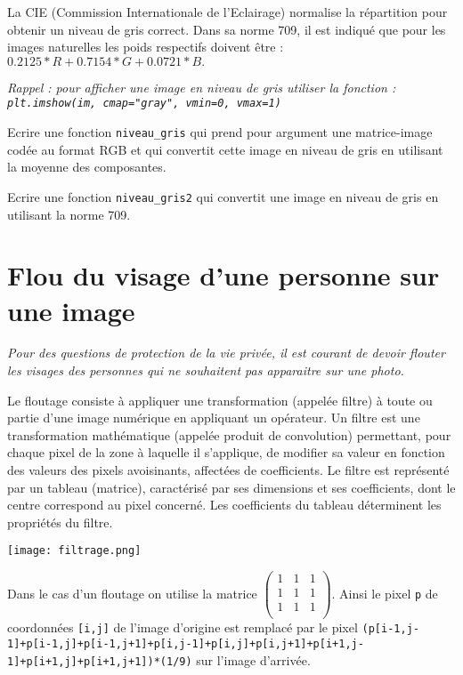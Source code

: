 La CIE (Commission Internationale de l’Eclairage) normalise la répartition pour obtenir un niveau de gris correct. Dans sa norme 709, il est indiqué que pour les images naturelles les poids respectifs doivent être : $0.2125 * R + 0.7154 * G + 0.0721 * B.$

\textit{Rappel : pour afficher une image en niveau de gris utiliser la fonction : \texttt{plt.imshow(im, cmap="gray", vmin=0, vmax=1)}}

\begin{question}
Ecrire une fonction \texttt{niveau\_gris} qui prend pour argument une matrice-image codée au format RGB et qui convertit cette image en niveau de gris en utilisant la moyenne des composantes.
\end{question}

\begin{question} %
Ecrire une fonction \texttt{niveau\_gris2} qui convertit une image en niveau de gris en utilisant la norme 709.
\end{question}





\section*{Flou du visage d'une personne sur une image}


\textit{Pour des questions de protection de la vie privée, il est courant de devoir flouter les visages des personnes qui ne souhaitent pas apparaitre sur une photo. }

Le floutage consiste à appliquer une transformation (appelée filtre) à toute ou partie d’une image numérique en  appliquant un opérateur.  Un filtre est une transformation mathématique (appelée produit de convolution) permettant, pour chaque pixel  de la zone à laquelle il s’applique, de modifier sa valeur en fonction des valeurs des pixels avoisinants, affectées de coefficients. 
 Le filtre est représenté par un tableau (matrice), caractérisé par ses dimensions et ses coefficients, dont le centre
 correspond au pixel concerné. Les coefficients du tableau déterminent les propriétés du filtre.

\begin{marginfigure}%
\texttt{[image: filtrage.png]}
\end{marginfigure}

Dans le cas d'un floutage on utilise la matrice $\begin{pmatrix}  1 &  1 & 1 \\1 &  1 & 1 \\1 &  1 & 1 \\\end{pmatrix}$. 
Ainsi le pixel \texttt{p} de coordonnées \texttt{[i,j]} de l'image d'origine est remplacé par le pixel \lstinline{(p[i-1,j-1]+p[i-1,j]+p[i-1,j+1]+p[i,j-1]+p[i,j]+p[i,j+1]+p[i+1,j-1]+p[i+1,j]+p[i+1,j+1])*(1/9)} sur l'image d'arrivée.

